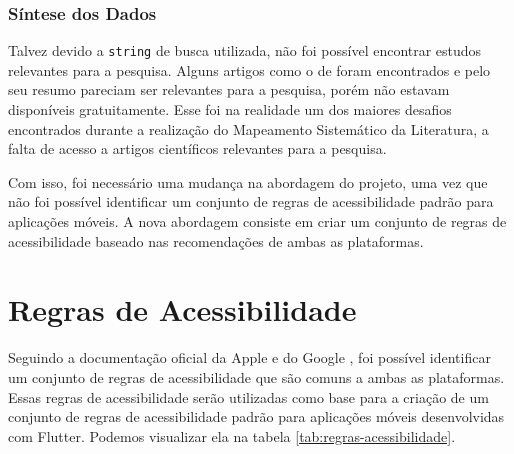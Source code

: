 \subsubsection{Síntese dos Dados}

Talvez devido a \texttt{string} de busca utilizada, não foi possível encontrar estudos relevantes para a pesquisa. Alguns artigos como o de \cite{mobileaccessibilityguidelinesadpotion} foram encontrados e pelo seu resumo pareciam ser relevantes para a pesquisa, porém não estavam disponíveis gratuitamente. Esse foi na realidade um dos maiores desafios encontrados durante a realização do Mapeamento Sistemático da Literatura, a falta de acesso a artigos científicos relevantes para a pesquisa.

Com isso, foi necessário uma mudança na abordagem do projeto, uma vez que não foi possível identificar um conjunto de regras de acessibilidade padrão para aplicações móveis. A nova abordagem consiste em criar um conjunto de regras de acessibilidade baseado nas recomendações de ambas as plataformas.

\section{Regras de Acessibilidade}\label{sec:regras-acessibilidade}

Seguindo a documentação oficial da Apple \cite{iosaccessibility} e do Google \cite{androidaccessibility}, foi possível identificar um conjunto de regras de acessibilidade que são comuns a ambas as plataformas. Essas regras de acessibilidade serão utilizadas como base para a criação de um conjunto de regras de acessibilidade padrão para aplicações móveis desenvolvidas com Flutter. Podemos visualizar ela na tabela \ref{tab:regras-acessibilidade}.

\renewcommand{\thera}{RA\arabic{ra}}

